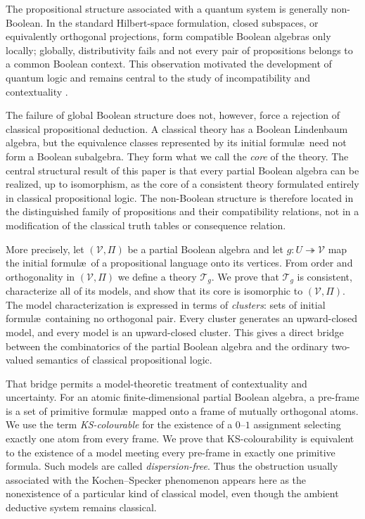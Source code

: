 \documentclass{article}   	%
\theoremstyle{plain}
\theoremstyle{definition}
\theoremstyle{remark}
\begin{document}
The propositional structure associated with a quantum system is generally non-Boolean.  In the standard Hilbert-space formulation, closed subspaces, or equivalently orthogonal projections, form compatible Boolean algebras only locally; globally, distributivity fails and not every pair of propositions belongs to a common Boolean context.  This observation motivated the development of quantum logic and remains central to the study of incompatibility and contextuality \cite{Varadarajan,KS}.

The failure of global Boolean structure does not, however, force a rejection of classical propositional deduction.  A classical theory has a Boolean Lindenbaum algebra, but the equivalence classes represented by its initial formul\ae\ need not form a Boolean subalgebra.  They form what we call the \emph{core} of the theory.  The central structural result of this paper is that every partial Boolean algebra can be realized, up to isomorphism, as the core of a consistent theory formulated entirely in classical propositional logic.  The non-Boolean structure is therefore located in the distinguished family of propositions and their compatibility relations, not in a modification of the classical truth tables or consequence relation.

More precisely, let $(\mathcal V,\Pi)$ be a partial Boolean algebra and let $g:U\twoheadrightarrow\mathcal V$ map the initial formul\ae\ of a propositional language onto its vertices.  From order and orthogonality in $(\mathcal V,\Pi)$ we define a theory $\mathcal T_g$.  We prove that $\mathcal T_g$ is consistent, characterize all of its models, and show that its core is isomorphic to $(\mathcal V,\Pi)$.  The model characterization is expressed in terms of \emph{clusters}: sets of initial formul\ae\ containing no orthogonal pair.  Every cluster generates an upward-closed model, and every model is an upward-closed cluster.  This gives a direct bridge between the combinatorics of the partial Boolean algebra and the ordinary two-valued semantics of classical propositional logic.

That bridge permits a model-theoretic treatment of contextuality and uncertainty.  For an atomic finite-dimensional partial Boolean algebra, a pre-frame is a set of primitive formul\ae\ mapped onto a frame of mutually orthogonal atoms.  We use the term \emph{KS-colourable} for the existence of a $0$--$1$ assignment selecting exactly one atom from every frame.  We prove that KS-colourability is equivalent to the existence of a model meeting every pre-frame in exactly one primitive formula.  Such models are called \emph{dispersion-free}.  Thus the obstruction usually associated with the Kochen--Specker phenomenon appears here as the nonexistence of a particular kind of classical model, even though the ambient deductive system remains classical.
\end{document}
